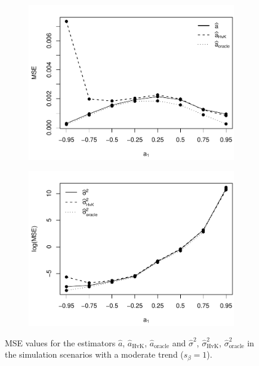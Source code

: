 \begin{figure}[t!]
\begin{subfigure}[b]{0.475\textwidth}
\includegraphics[width=\textwidth]{Plots/MSE_a1_T=500_slope=1_(q,r,M1,M2)=(25,10,20,30).pdf}
\end{subfigure}\hspace{0.25cm}
\begin{subfigure}[b]{0.475\textwidth}
\includegraphics[width=\textwidth]{Plots/MSE_lrv_T=500_slope=1_(q,r,M1,M2)=(25,10,20,30).pdf}
\end{subfigure}
\caption{MSE values for the estimators $\widehat{a}$, $\widehat{a}_{\text{HvK}}$, $\widehat{a}_{\text{oracle}}$ and $\widehat{\sigma}^2$, $\widehat{\sigma}^2_{\text{HvK}}$, $\widehat{\sigma}^2_{\text{oracle}}$ in the simulation scenarios with a moderate trend ($s_\beta=1$).}\label{fig:MSE_slope1}
\end{figure}


